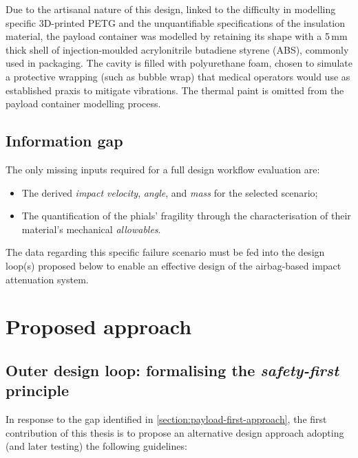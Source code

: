 Due to the artisanal nature of this design, linked to the difficulty in modelling specific 3D-printed PETG and the unquantifiable specifications of the insulation material, the payload container was modelled by retaining its shape with a 5\,mm thick shell of injection-moulded acrylonitrile butadiene styrene (ABS), commonly used in packaging. The cavity is filled with polyurethane foam, chosen to simulate a protective wrapping (such as bubble wrap) that medical operators would use as established praxis to mitigate vibrations. The thermal paint is omitted from the payload container modelling process.



\subsection{Information gap}
The only missing inputs required for a full design workflow evaluation are:
\begin{itemize}
    \item The derived \textit{impact velocity}, \textit{angle}, and \textit{mass} for the selected scenario;
    \item The quantification of the phials' fragility through the characterisation of their material's mechanical \textit{allowables}.
\end{itemize}

The data regarding this specific failure scenario must be fed into the design loop(s) proposed below to enable an effective design of the airbag-based impact attenuation system.

\section{Proposed approach}\label{section:proposed-approach}
\subsection{Outer design loop: formalising the \textit{safety-first} principle}\label{section:outer-design-loop}

In response to the gap identified in \cref{section:payload-first-approach}, the first contribution of this thesis is to propose an alternative design approach adopting (and later testing) the following guidelines:

